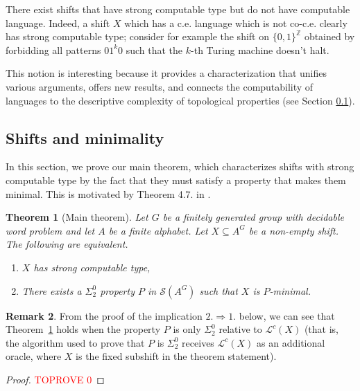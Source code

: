 \documentclass[french,american]{article}
\theoremstyle{plain}
\newtheorem{theorem}{Theorem}[section]
\theoremstyle{definition}
\newtheorem{remark}[theorem]{Remark}
\theoremstyle{remark}
\theoremstyle{plain}
\newcommand{\Z}{\mathbb{Z}}
\begin{document}
There exist shifts that have strong computable type but do not have
computable language. Indeed, a shift $X$ which has a c.e. language
which is not co-c.e. clearly has strong computable type; consider for example the shift on $\{0,1\}^\Z$ obtained by forbidding all patterns $01^k0$ such that the $k$-th Turing machine doesn't halt.

This notion is interesting because it provides a characterization
that unifies various arguments, offers new results, and connects the
computability of languages to the descriptive complexity of topological
properties (see Section \ref{subsec:Subshifts-and-minimality}).

\subsection{Shifts and minimality}\label{subsec:Subshifts-and-minimality}

In this section, we prove our main theorem, which characterizes shifts
with strong computable type by the fact that they must satisfy a property
that makes them minimal. This is motivated by Theorem
4.7. in \cite{AH22c}.

\begin{theorem}[Main theorem]
\label{thm:main}Let $G$ be a finitely generated group with
 decidable word problem and let $A$ be a finite alphabet. Let $X\subseteq A^{G}$
be a non-empty shift. The following are equivalent.
\begin{enumerate}
\item $X$ has strong computable type,
\item There exists a $\Sigma_{2}^{0}$ property $P$ in $\mathcal{S}(A^{G})$
such that $X$ is $P$-minimal.
\end{enumerate}
\end{theorem}


\begin{remark}
From the proof of the implication $2.\Rightarrow1.$ below, we can see that Theorem~\ref{thm:main} holds when the property $P$ is only $\Sigma_2^0$ relative to $\mathcal L^c(X)$ (that is, the algorithm used to prove that $P$ is $\Sigma_2^0$ receives $\mathcal L^c(X)$ as an additional oracle, where $X$ is the fixed subshift in the theorem statement).
\end{remark}

\begin{proof}\textcolor{red}{TOPROVE 0}\end{proof}
\end{document}
